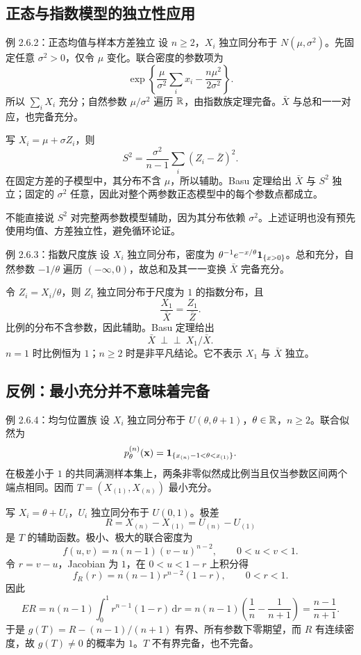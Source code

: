 \subsection{正态与指数模型的独立性应用}
\begin{examplebox}{例 2.6.2：正态均值与样本方差独立}
设 $n\ge2$，$X_i$ 独立同分布于 $N(\mu,\sigma^2)$。先固定任意 $\sigma^2>0$，仅令 $\mu$ 变化。联合密度的参数项为
\[
 \exp\left\{\frac{\mu}{\sigma^2}\sum_i x_i-\frac{n\mu^2}{2\sigma^2}\right\}.
\]
所以 $\sum_iX_i$ 充分；自然参数 $\mu/\sigma^2$ 遍历 $\mathbb R$，由指数族定理完备。$\bar X$ 与总和一一对应，也完备充分。

写 $X_i=\mu+\sigma Z_i$，则
\[
 S^2=\frac{\sigma^2}{n-1}\sum_i(Z_i-\bar Z)^2.
\]
在固定方差的子模型中，其分布不含 $\mu$，所以辅助。Basu 定理给出 $\bar X$ 与 $S^2$ 独立；固定的 $\sigma^2$ 任意，因此对整个两参数正态模型中的每个参数点都成立。
\end{examplebox}

不能直接说 $S^2$ 对完整两参数模型辅助，因为其分布依赖 $\sigma^2$。上述证明也没有预先使用均值、方差独立性，避免循环论证。

\begin{examplebox}{例 2.6.3：指数尺度族}
设 $X_i$ 独立同分布，密度为 $\theta^{-1}e^{-x/\theta}\mathbf 1_{\{x>0\}}$。总和充分，自然参数 $-1/\theta$ 遍历 $(-\infty,0)$，故总和及其一一变换 $\bar X$ 完备充分。

令 $Z_i=X_i/\theta$，则 $Z_i$ 独立同分布于尺度为 $1$ 的指数分布，且
\[
 \frac{X_1}{\bar X}=\frac{Z_1}{\bar Z}.
\]
比例的分布不含参数，因此辅助。Basu 定理给出
\[
 \bar X\ \perp\!\!\!\perp\ X_1/\bar X.
\]
$n=1$ 时比例恒为 $1$；$n\ge2$ 时是非平凡结论。它不表示 $X_1$ 与 $\bar X$ 独立。
\end{examplebox}

\subsection{反例：最小充分并不意味着完备}
\begin{examplebox}{例 2.6.4：均匀位置族}
设 $X_i$ 独立同分布于 $U(\theta,\theta+1)$，$\theta\in\mathbb R$，$n\ge2$。联合似然为
\[
 p_\theta^{(n)}(\mathbf x)
 =\mathbf 1_{\{x_{(n)}-1<\theta<x_{(1)}\}}.
\]
在极差小于 $1$ 的共同满测样本集上，两条非零似然成比例当且仅当参数区间两个端点相同。因而 $T=(X_{(1)},X_{(n)})$ 最小充分。

写 $X_i=\theta+U_i$，$U_i$ 独立同分布于 $U(0,1)$。极差
\[
 R=X_{(n)}-X_{(1)}=U_{(n)}-U_{(1)}
\]
是 $T$ 的辅助函数。极小、极大的联合密度为
\[
 f(u,v)=n(n-1)(v-u)^{n-2},\qquad0<u<v<1.
\]
令 $r=v-u$，Jacobian 为 $1$，在 $0<u<1-r$ 上积分得
\[
 f_R(r)=n(n-1)r^{n-2}(1-r),\qquad0<r<1.
\]
因此
\[
 ER=n(n-1)\int_0^1r^{n-1}(1-r)\,\mathrm dr
 =n(n-1)\left(\frac1n-\frac1{n+1}\right)=\frac{n-1}{n+1}.
\]
于是 $g(T)=R-(n-1)/(n+1)$ 有界、所有参数下零期望，而 $R$ 有连续密度，故 $g(T)\ne0$ 的概率为 $1$。$T$ 不有界完备，也不完备。
\end{examplebox}

